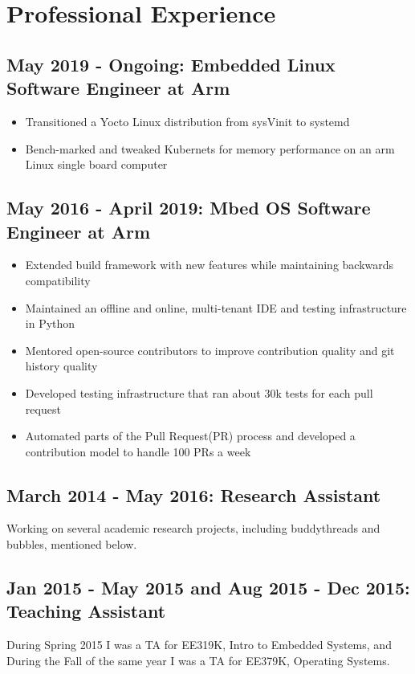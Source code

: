 \documentclass[letterpaper,12pt]{resume}
\begin{document}
\section{Professional Experience}
\subsection{May 2019 - Ongoing: Embedded Linux Software Engineer at Arm}
\begin{itemize}
  \item
    Transitioned a Yocto Linux distribution from sysVinit to systemd
  \item
    Bench-marked and tweaked Kubernets for memory performance on an arm Linux single board computer
\end{itemize}
\subsection{May 2016 - April 2019: Mbed OS Software Engineer at Arm}
\begin{itemize}
  \item
    Extended build framework with new features while maintaining backwards compatibility
  \item
    Maintained an offline and online, multi-tenant IDE and testing infrastructure in Python
  \item
    Mentored open-source contributors to improve contribution quality and git history quality 
  \item
    Developed testing infrastructure that ran about 30k tests for each pull request
  \item
    Automated parts of the Pull Request(PR) process and developed a contribution model to handle 100 PRs a week
\end{itemize}

\subsection{March 2014 - May 2016: Research Assistant}
Working on several academic research projects, including buddythreads and
bubbles, mentioned below.

\subsection{Jan 2015 - May 2015 and Aug 2015 - Dec 2015: Teaching Assistant}
During Spring 2015 I was a TA for EE319K, Intro to Embedded Systems, and During
the Fall of the same year I was a TA for EE379K, Operating Systems.
\end{document}
